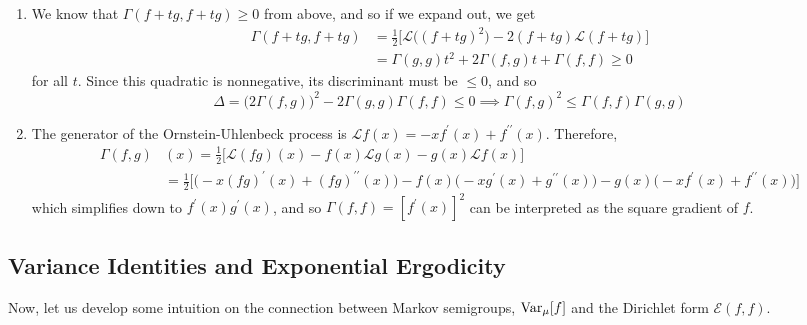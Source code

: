 \begin{solution}
\begin{enumerate}
      \item We know that $\Gamma(f + t g, f + tg) \geq 0$ from above, and so if we expand out, we get
      \begin{align}
        \Gamma(f + t g, f + tg) & = \frac{1}{2} \Big[ \mathscr{L} \big( (f + t g)^2 \big) - 2 (f + t g) \mathscr{L}(f + t g) \Big] \\
        & = \Gamma(g, g) t^2 + 2 \Gamma (f, g) t + \Gamma(f, f) \geq 0 
      \end{align}
      for all $t$. Since this quadratic is nonnegative, its discriminant must be $\leq 0$, and so 
      \begin{equation}
        \Delta = \big( 2 \Gamma (f, g) \big)^2 - 2 \Gamma(g, g) \Gamma(f, f) \leq 0 \implies \Gamma(f, g)^2 \leq \Gamma(f, f) \Gamma(g, g)
      \end{equation}
      
      \item The generator of the Ornstein-Uhlenbeck process is $\mathscr{L}f(x) = -x f^\prime(x) + f^{\prime\prime} (x)$. Therefore, 
      \begin{align}
        \Gamma (f, g) & (x) = \frac{1}{2} \big[ \mathscr{L} (f g)(x) - f(x) \mathscr{L} g(x) - g(x) \mathscr{L} f (x) \big] \\
        & = \frac{1}{2} \Big[ \big( -x (f g)^\prime (x) + (f g)^{\prime\prime} (x) \big) - f(x) \big( -x g^\prime(x) + g^{\prime\prime} (x) \big) - g(x) \big( -x f^\prime(x) + f^{\prime\prime} (x) \big) \Big]
      \end{align}
      which simplifies down to $f^\prime(x) g^\prime(x)$, and so $\Gamma(f, f) = [ f^\prime(x)]^2$ can be interpreted as the square gradient of $f$. 
    \end{enumerate}
  \end{solution}

\subsection{Variance Identities and Exponential Ergodicity}

  Now, let us develop some intuition on the connection between Markov semigroups, $\operatorname{Var}_\mu [f]$ and the Dirichlet form $\mathcal{E}(f, f)$. 

